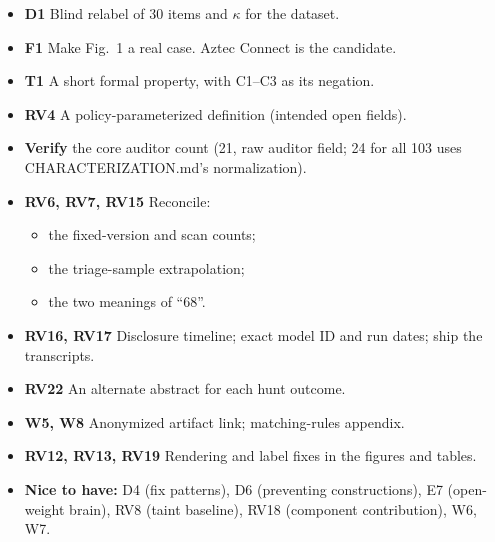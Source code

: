 {
\begin{itemize}\setlength\itemsep{0pt}
\item \textbf{D1} Blind relabel of 30 items and $\kappa$ for the dataset.
\item \textbf{F1} Make Fig.~1 a real case. Aztec Connect is the candidate.
\item \textbf{T1} A short formal property, with C1--C3 as its negation.
\item \textbf{RV4} A policy-parameterized definition (intended open fields).
\item \textbf{Verify} the core auditor count (21, raw auditor field; 24 for
all 103 uses CHARACTERIZATION.md's normalization).
\item \textbf{RV6, RV7, RV15} Reconcile:
  \begin{itemize}\setlength\itemsep{0pt}
  \item the fixed-version and scan counts;
  \item the triage-sample extrapolation;
  \item the two meanings of ``68''.
  \end{itemize}
\item \textbf{RV16, RV17} Disclosure timeline; exact model ID and run dates;
ship the transcripts.
\item \textbf{RV22} An alternate abstract for each hunt outcome.
\item \textbf{W5, W8} Anonymized artifact link; matching-rules appendix.
\item \textbf{RV12, RV13, RV19} Rendering and label fixes in the figures and
tables.
\item \textbf{Nice to have:} D4 (fix patterns), D6 (preventing
constructions), E7 (open-weight brain), RV8 (taint baseline), RV18
(component contribution), W6, W7.
\end{itemize}
}

